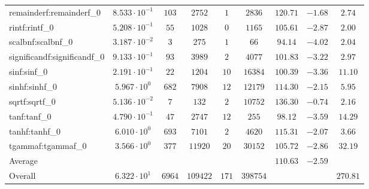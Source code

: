 \begin{tabular}{|l|c|c|c|c|c|c|c|c|}
remainderf:remainderf\_0     & $ 8.533 \cdot 10^{-1} $ & $ 103    $ & $ 2752   $ & $ 1   $ & $ 2836   $ & $ 120.71      $ & $ -1.68   $ & $ 2.74    $ \\
rintf:rintf\_0               & $ 5.208 \cdot 10^{-1} $ & $ 55     $ & $ 1028   $ & $ 0   $ & $ 1165   $ & $ 105.61      $ & $ -2.87   $ & $ 2.00    $ \\
scalbnf:scalbnf\_0           & $ 3.187 \cdot 10^{-2} $ & $ 3      $ & $ 275    $ & $ 1   $ & $ 66     $ & $ 94.14       $ & $ -4.02   $ & $ 2.04    $ \\
significandf:significandf\_0 & $ 9.133 \cdot 10^{-1} $ & $ 93     $ & $ 3989   $ & $ 2   $ & $ 4077   $ & $ 101.83      $ & $ -3.22   $ & $ 2.97    $ \\
sinf:sinf\_0                 & $ 2.191 \cdot 10^{-1} $ & $ 22     $ & $ 1204   $ & $ 10  $ & $ 16384  $ & $ 100.39      $ & $ -3.36   $ & $ 11.10   $ \\
sinhf:sinhf\_0               & $ 5.967 \cdot 10^{0}  $ & $ 682    $ & $ 7908   $ & $ 12  $ & $ 12179  $ & $ 114.30      $ & $ -2.15   $ & $ 5.95    $ \\
sqrtf:sqrtf\_0               & $ 5.136 \cdot 10^{-2} $ & $ 7      $ & $ 132    $ & $ 2   $ & $ 10752  $ & $ 136.30      $ & $ -0.74   $ & $ 2.16    $ \\
tanf:tanf\_0                 & $ 4.790 \cdot 10^{-1} $ & $ 47     $ & $ 2747   $ & $ 12  $ & $ 255    $ & $ 98.12       $ & $ -3.59   $ & $ 14.29   $ \\
tanhf:tanhf\_0               & $ 6.010 \cdot 10^{0}  $ & $ 693    $ & $ 7101   $ & $ 2   $ & $ 4620   $ & $ 115.31      $ & $ -2.07   $ & $ 3.66    $ \\
tgammaf:tgammaf\_0           & $ 3.566 \cdot 10^{0}  $ & $ 377    $ & $ 11920  $ & $ 20  $ & $ 30152  $ & $ 105.72      $ & $ -2.86   $ & $ 32.19   $ \\
\hline
Average                      & $                     $ & $        $ & $        $ & $     $ & $        $ & $ 110.63      $ & $ -2.59   $ & $         $ \\
\hline
Overall                      & $ 6.322 \cdot 10^{1}  $ & $ 6964   $ & $ 109422 $ & $ 171 $ & $ 398754 $ & $             $ & $         $ & $ 270.81  $ \\
\hline
\end{tabular}
